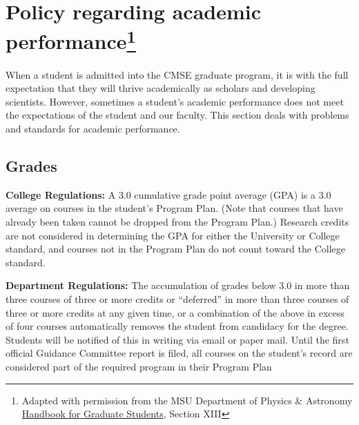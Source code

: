 \section[Policy regarding academic performance]{Policy regarding
  academic performance\footnote{Adapted with permission from the MSU
    Department of Physics \& Astronomy
    \href{https://www.pa.msu.edu/grad/GradHandbook_Aug2015.pdf}{Handbook
      for Graduate
      Students}, Section XIII}}

When a student is admitted into the CMSE graduate program, it is with
the full expectation that they will thrive academically as scholars
and developing scientists. However, sometimes a student's academic
performance does not meet the expectations of the student and our
faculty.  This section deals with problems and standards for academic
performance.

\subsection{Grades}

\noindent \textbf{College Regulations:} A 3.0 cumulative grade point
average (GPA) is a 3.0 average on courses in the student's Program
Plan.  (Note that courses that have already been taken cannot be
dropped from the Program Plan.)  Research credits are not considered
in determining the GPA for either the University or College standard,
and courses not in the Program Plan do not count toward the College
standard.

\noindent \textbf{Department Regulations:} The accumulation of grades
below 3.0 in more than three courses of three or more credits or
``deferred'' in more than three courses of three or more credits at
any given time, or a combination of the above in excess of four
courses automatically removes the student from candidacy for the
degree.  Students will be notified of this in writing via email or
paper mail. Until the first official Guidance Committee report is
filed, all courses on the student's record are considered part of the
required program in their Program Plan



